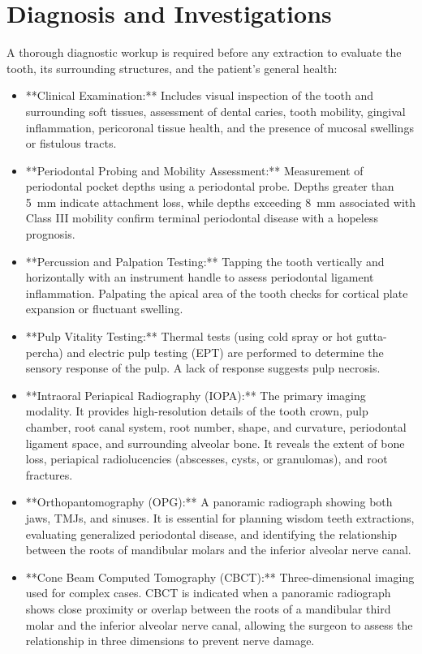 \section*{Diagnosis and Investigations}
A thorough diagnostic workup is required before any extraction to evaluate the tooth, its surrounding structures, and the patient's general health:

\begin{itemize}
  \item **Clinical Examination:** Includes visual inspection of the tooth and surrounding soft tissues, assessment of dental caries, tooth mobility, gingival inflammation, pericoronal tissue health, and the presence of mucosal swellings or fistulous tracts.
  \item **Periodontal Probing and Mobility Assessment:** Measurement of periodontal pocket depths using a periodontal probe. Depths greater than 5~mm indicate attachment loss, while depths exceeding 8~mm associated with Class III mobility confirm terminal periodontal disease with a hopeless prognosis.
  \item **Percussion and Palpation Testing:** Tapping the tooth vertically and horizontally with an instrument handle to assess periodontal ligament inflammation. Palpating the apical area of the tooth checks for cortical plate expansion or fluctuant swelling.
  \item **Pulp Vitality Testing:** Thermal tests (using cold spray or hot gutta-percha) and electric pulp testing (EPT) are performed to determine the sensory response of the pulp. A lack of response suggests pulp necrosis.
  \item **Intraoral Periapical Radiography (IOPA):** The primary imaging modality. It provides high-resolution details of the tooth crown, pulp chamber, root canal system, root number, shape, and curvature, periodontal ligament space, and surrounding alveolar bone. It reveals the extent of bone loss, periapical radiolucencies (abscesses, cysts, or granulomas), and root fractures.
  \item **Orthopantomography (OPG):** A panoramic radiograph showing both jaws, TMJs, and sinuses. It is essential for planning wisdom teeth extractions, evaluating generalized periodontal disease, and identifying the relationship between the roots of mandibular molars and the inferior alveolar nerve canal.
  \item **Cone Beam Computed Tomography (CBCT):** Three-dimensional imaging used for complex cases. CBCT is indicated when a panoramic radiograph shows close proximity or overlap between the roots of a mandibular third molar and the inferior alveolar nerve canal, allowing the surgeon to assess the relationship in three dimensions to prevent nerve damage.

\end{itemize}
